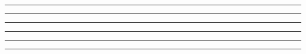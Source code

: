 \documentclass[preview]{standalone}
\begin{document}

%
\begin{center} \color{lightgray}
    \rule{5.4in}{0.1pt}
\end{center}



%
\pagebreak



%
\begin{center} \color{lightgray}
    \rule{5.4in}{0.1pt}
\end{center}



%
\begin{center} \color{lightgray}
    \rule{5.4in}{0.1pt}
\end{center}



%
\pagebreak



%
\begin{center} \color{lightgray}
    \rule{5.4in}{0.1pt}
\end{center}



%
\begin{center} \color{lightgray}
    \rule{5.4in}{0.1pt}
\end{center}



%
\pagebreak



%
\begin{center} \color{lightgray}
    \rule{5.4in}{0.1pt}
\end{center}
\end{document}
